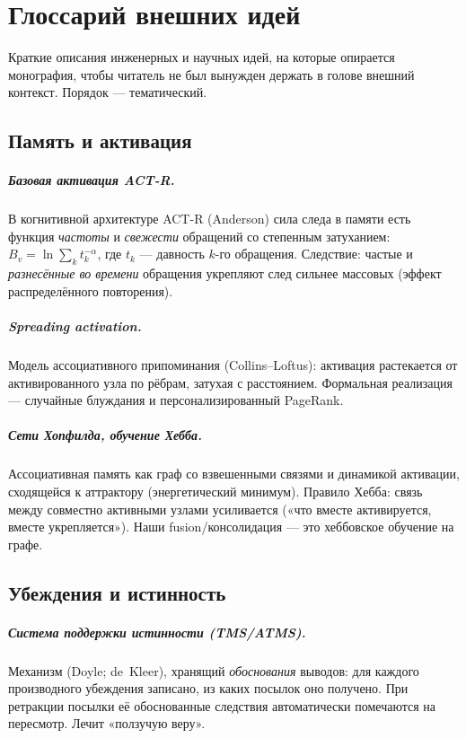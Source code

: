 \chapter{Глоссарий внешних идей}
\label{ch:glossary}

Краткие описания инженерных и научных идей, на которые опирается монография, чтобы
читатель не был вынужден держать в голове внешний контекст. Порядок — тематический.

\section*{Память и активация}

\paragraph{Базовая активация ACT-R.} В когнитивной архитектуре ACT-R (Anderson)
сила следа в памяти есть функция \emph{частоты} и \emph{свежести} обращений со
степенным затуханием: $B_v=\ln\sum_k t_k^{-\alpha}$, где $t_k$ — давность $k$-го
обращения. Следствие: частые и \emph{разнесённые во времени} обращения укрепляют
след сильнее массовых (эффект распределённого повторения).

\paragraph{Spreading activation.} Модель ассоциативного припоминания
(Collins–Loftus): активация растекается от активированного узла по рёбрам, затухая
с расстоянием. Формальная реализация — случайные блуждания и персонализированный
PageRank.

\paragraph{Сети Хопфилда, обучение Хебба.} Ассоциативная память как граф со
взвешенными связями и динамикой активации, сходящейся к аттрактору (энергетический
минимум). Правило Хебба: связь между совместно активными узлами усиливается («что
вместе активируется, вместе укрепляется»). Наши fusion/консолидация — это
хеббовское обучение на графе.

\section*{Убеждения и истинность}

\paragraph{Система поддержки истинности (TMS/ATMS).} Механизм (Doyle;
de~Kleer), хранящий \emph{обоснования} выводов: для каждого производного убеждения
записано, из каких посылок оно получено. При ретракции посылки её обоснованные
следствия автоматически помечаются на пересмотр. Лечит «ползучую веру».


